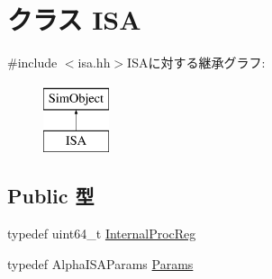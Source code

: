 \hypertarget{classAlphaISA_1_1ISA}{
\section{クラス ISA}
\label{classAlphaISA_1_1ISA}
}


{\ttfamily \#include $<$isa.hh$>$}ISAに対する継承グラフ:\begin{figure}[H]
\begin{center}
\leavevmode
\includegraphics[height=2cm]{classAlphaISA_1_1ISA}
\end{center}
\end{figure}
\subsection*{Public 型}
\begin{DoxyCompactItemize}
\item 
typedef uint64\_\-t \hyperlink{classAlphaISA_1_1ISA_a3be59bc6c39d87f5d4bd0e05abe0b416}{InternalProcReg}
\item 
typedef AlphaISAParams \hyperlink{classAlphaISA_1_1ISA_a492961bc1e489616b642e85a4e2ddf03}{Params}
\end{DoxyCompactItemize}
